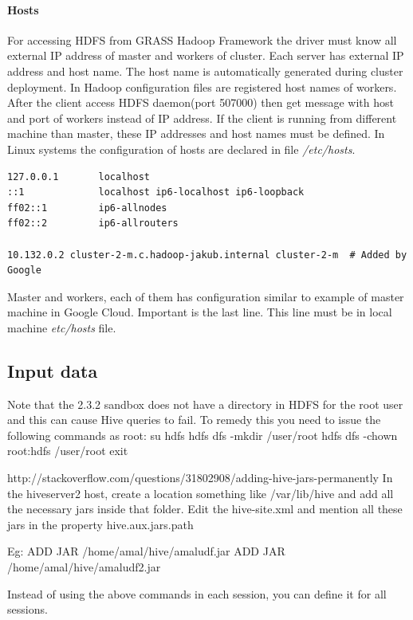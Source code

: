 \documentclass[a4paper,12pt,oneside]{report}
\begin{document}
\paragraph{Hosts} For accessing HDFS from GRASS Hadoop Framework the driver must know all external IP address of master and workers of cluster. Each server has external IP address and host name. The host name is automatically generated during cluster deployment. In Hadoop configuration files are registered host names of workers. After the client access HDFS daemon(port 507000) then get message with host and port of workers instead of IP address. If the client is running from different machine than master, these IP addresses and host names must be defined. In Linux systems the configuration of hosts  are declared in file \textit{/etc/hosts}. 
\begin{footnotesize}
\begin{lstlisting}[style=python]
127.0.0.1       localhost
::1             localhost ip6-localhost ip6-loopback
ff02::1         ip6-allnodes
ff02::2         ip6-allrouters

10.132.0.2 cluster-2-m.c.hadoop-jakub.internal cluster-2-m  # Added by Google
\end{lstlisting}
\end{footnotesize}
Master and workers, each of them has configuration similar to example of master machine in Google Cloud. Important is the  last line. This line must be in local machine \textit{etc/hosts} file.




\subsection{Input data}
Note that the 2.3.2 sandbox does not have a directory in HDFS for the root user and this can cause Hive queries to fail. To remedy this you need to issue the following commands as root:
su hdfs
hdfs dfs -mkdir /user/root
hdfs dfs -chown root:hdfs /user/root
exit
	



http://stackoverflow.com/questions/31802908/adding-hive-jars-permanently
In the hiveserver2 host, create a location something like /var/lib/hive and add all the necessary jars inside that folder. Edit the hive-site.xml and mention all these jars in the property hive.aux.jars.path

Eg: ADD JAR /home/amal/hive/amaludf.jar ADD JAR /home/amal/hive/amaludf2.jar

Instead of using the above commands in each session, you can define it for all sessions.
\end{document}
